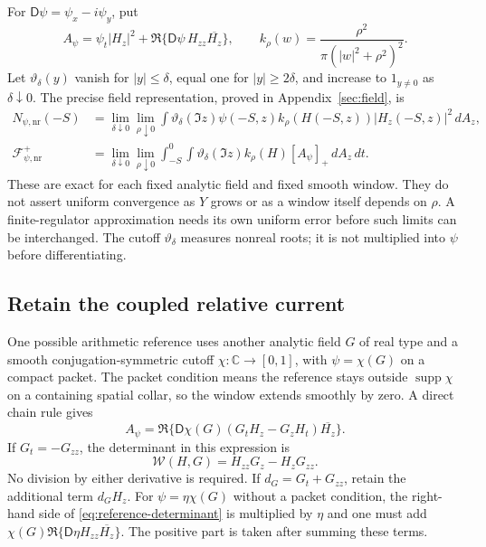 \documentclass[11pt]{article}
\newcommand{\C}{\mathbb C}
\newcommand{\dd}{\,d}
\newcommand{\nr}{\mathrm{nr}}
\newcommand{\D}{\mathsf D}
\newcommand{\FF}{\mathcal F}
\newcommand{\WW}{\mathcal W}
\DeclareMathOperator{\supp}{supp}
\theoremstyle{remark}
\begin{document}
For $\D\psi=\psi_x-i\psi_y$, put
\begin{equation}
 A_\psi=\psi_t|H_z|^2+
          \Re\{\D\psi\,H_{zz}\overline{H_z}\},\qquad
 k_\rho(w)=\frac{\rho^2}{\pi(|w|^2+\rho^2)^2}.
 \label{eq:resource-numerator}
\end{equation}
Let $\vartheta_\delta(y)$ vanish for $|y|\le\delta$, equal one for
$|y|\ge2\delta$, and increase to $1_{y\ne0}$ as
$\delta\downarrow0$. The precise field representation, proved in
Appendix~\ref{sec:field}, is
\begin{align}
 N_{\psi,\nr}(-S)
 &=\lim_{\delta\downarrow0}\lim_{\rho\downarrow0}
   \int\vartheta_\delta(\Im z)\psi(-S,z)
     k_\rho(H(-S,z))|H_z(-S,z)|^2\dd A_z,
 \label{eq:resource-population}\\
 \FF_{\psi,\nr}^{+}
 &=\lim_{\delta\downarrow0}\lim_{\rho\downarrow0}
   \int_{-S}^0\int\vartheta_\delta(\Im z)
        k_\rho(H)[A_\psi]_+\dd A_z\dd t.
 \label{eq:resource-field-flux}
\end{align}
These are exact for each fixed analytic field and fixed smooth window.
They do not assert uniform convergence as $Y$ grows or as a window
itself depends on $\rho$. A finite-regulator approximation needs its
own uniform error before such limits can be interchanged. The cutoff
$\vartheta_\delta$ measures nonreal roots; it is not multiplied into
$\psi$ before differentiating.

\subsection{Retain the coupled relative current}

One possible arithmetic reference uses another analytic field $G$ of
real type and a smooth conjugation-symmetric cutoff
$\chi:\C\to[0,1]$, with $\psi=\chi(G)$ on a compact packet.
The packet condition means the reference stays outside $\supp\chi$
on a containing spatial collar, so the window extends smoothly by zero.
A direct chain rule gives
\begin{equation}
 A_\psi=\Re\{\D\chi(G)(G_tH_z-G_zH_t)\overline{H_z}\}.
 \label{eq:reference-determinant}
\end{equation}
If $G_t=-G_{zz}$, the determinant in this expression is
\[
 \WW(H,G)=H_{zz}G_z-H_zG_{zz}.
\]
No division by either derivative is required. If
$d_G=G_t+G_{zz}$, retain the additional term $d_GH_z$.
For $\psi=\eta\chi(G)$ without a packet condition, the right-hand
side of \eqref{eq:reference-determinant} is multiplied by $\eta$ and
one must add
$\chi(G)\Re\{\D\eta H_{zz}\overline{H_z}\}$.
The positive part is taken after summing these terms.
\end{document}
